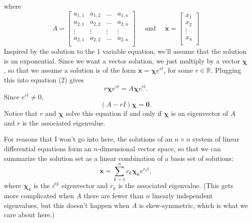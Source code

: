 \documentclass{res}
\newcommand{\bx}{\mathbf{x}}
\newcommand{\bchi}{\boldsymbol{\chi}}
\newcommand{\bzero}{\mathbf{0}}
\begin{document}
\begin{resume}
where
\[A = \begin{bmatrix}
        a_{1,1} & a_{1,2} & \ldots & a_{1,n} \\
        a_{2,1} & a_{2,2} & \ldots & a_{2,n} \\
        \vdots  & \vdots  & \vdots & \vdots  \\
        a_{2,1} & a_{2,2} & \ldots & a_{2,n} \\
      \end{bmatrix}
\quad \mbox{ and } \quad
\bx = \begin{bmatrix}
        x_1    \\
        x_2    \\
        \vdots \\
        x_n    \\
      \end{bmatrix}
\]
Inspired by the solution to the $1$ variable equation, we'll assume that the
solution is an exponential. Since we want a vector solution, we just multiply
by a vector $\bchi$, so that we assume a solution is of the form
$\bx = \bchi e^{rt}$, for some $r \in \mathbb{R}$. Plugging this into equation
(2) gives
\[r \bchi e^{rt} = A \bchi e^{rt}.\]
Since $e^{rt} \neq 0$,
\[(A - rI)\bchi = \bzero.\]
Notice that $r$ and $\bchi$ solve this equation if and only if $\bchi$ is an
eigenvector of $A$ and $r$ is the associated eigenvalue.

For reasons that I won't go into here, the solutions of an $n \times n$ system
of linear differential equations form an $n$-dimensional vector space, so that
we can summarize the solution set as a linear combination of a basis set of
solutions:
\[\bx = \sum_{k = 1}^{n} c_k \bchi_k e^{r_k t},\]
where $\bchi_k$ is the $i^{th}$ eigenvector and $r_k$ is the associated
eigenvalue. (This gets more complicated when $A$ there are fewer than $n$
linearly independent eigenvalues, but this doesn't happen when $A$ is
skew-symmetric, which is what we care about here.)


\end{resume}
\end{document}

